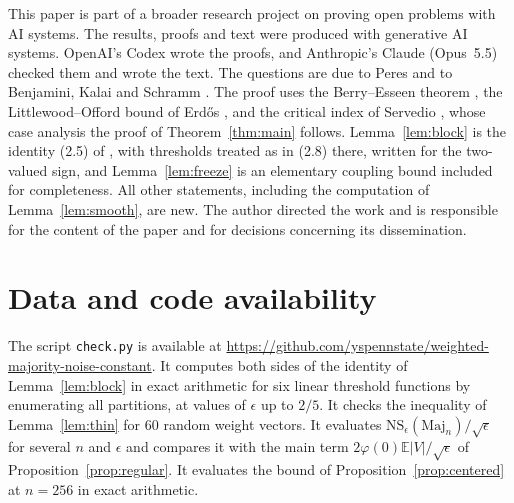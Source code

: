 \documentclass[11pt]{amsart}
\theoremstyle{remark}
\numberwithin{equation}{section}
\newcommand{\EE}{\mathbb{E}}
\begin{document}
This paper is part of a broader research project on proving open problems with AI systems. The results, proofs and text were produced with generative AI systems. OpenAI's Codex wrote the proofs, and Anthropic's Claude (Opus~5.5) checked them and wrote the text. The questions are due to Peres \cite{Per04} and to Benjamini, Kalai and Schramm \cite{BKS}. The proof uses the Berry--Esseen theorem \cite{Ber41,Ess42}, the Littlewood--Offord bound of Erd\H{o}s \cite{Erd45}, and the critical index of Servedio \cite{Ser07}, whose case analysis the proof of Theorem~\ref{thm:main} follows. Lemma~\ref{lem:block} is the identity (2.5) of \cite{Per04}, with thresholds treated as in (2.8) there, written for the two-valued sign, and Lemma~\ref{lem:freeze} is an elementary coupling bound included for completeness. All other statements, including the computation of Lemma~\ref{lem:smooth}, are new. The author directed the work and is responsible for the content of the paper and for decisions concerning its dissemination.

\section*{Data and code availability}

The script \texttt{check.py} is available at \url{https://github.com/yspennstate/weighted-majority-noise-constant}. It computes both sides of the identity of Lemma~\ref{lem:block} in exact arithmetic for six linear threshold functions by enumerating all partitions, at values of $\epsilon$ up to $2/5$. It checks the inequality of Lemma~\ref{lem:thin} for 60 random weight vectors. It evaluates $\mathrm{NS}_\epsilon(\mathrm{Maj}_n)/\sqrt\epsilon$ for several $n$ and $\epsilon$ and compares it with the main term $2\varphi(0)\EE|V|/\sqrt\epsilon$ of Proposition~\ref{prop:regular}. It evaluates the bound of Proposition~\ref{prop:centered} at $n=256$ in exact arithmetic.
\end{document}

